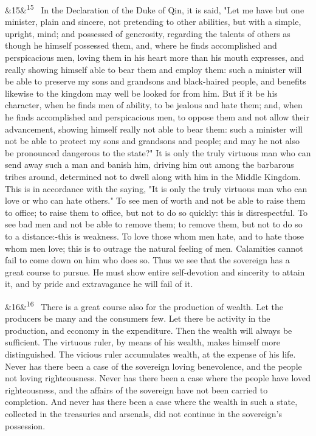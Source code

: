 \documentclass[12pt]{article}
\newcommand{\para}[1][]{\par\noindent\ifx&#1&\else\textsuperscript{\footnotesize #1}~\fi}
\begin{document}
\para[15] In the Declaration of the Duke of Qin, it is said, "Let me have but one minister, plain and sincere, not pretending to other abilities, but with a simple, upright, mind; and possessed of generosity, regarding the talents of others as though he himself possessed them, and, where he finds accomplished and perspicacious men, loving them in his heart more than his mouth expresses, and really showing himself able to bear them and employ them: such a minister will be able to preserve my sons and grandsons and black-haired people, and benefits likewise to the kingdom may well be looked for from him. But if it be his character, when he finds men of ability, to be jealous and hate them; and, when he finds accomplished and perspicacious men, to oppose them and not allow their advancement, showing himself really not able to bear them: such a minister will not be able to protect my sons and grandsons and people; and may he not also be pronounced dangerous to the state?" It is only the truly virtuous man who can send away such a man and banish him, driving him out among the barbarous tribes around, determined not to dwell along with him in the Middle Kingdom. This is in accordance with the saying, "It is only the truly virtuous man who can love or who can hate others." To see men of worth and not be able to raise them to office; to raise them to office, but not to do so quickly: this is disrespectful. To see bad men and not be able to remove them; to remove them, but not to do so to a distance:-this is weakness. To love those whom men hate, and to hate those whom men love; this is to outrage the natural feeling of men. Calamities cannot fail to come down on him who does so. Thus we see that the sovereign has a great course to pursue. He must show entire self-devotion and sincerity to attain it, and by pride and extravagance he will fail of it.

\para[16] There is a great course also for the production of wealth. Let the producers be many and the consumers few. Let there be activity in the production, and economy in the expenditure. Then the wealth will always be sufficient. The virtuous ruler, by means of his wealth, makes himself more distinguished. The vicious ruler accumulates wealth, at the expense of his life. Never has there been a case of the sovereign loving benevolence, and the people not loving righteousness. Never has there been a case where the people have loved righteousness, and the affairs of the sovereign have not been carried to completion. And never has there been a case where the wealth in such a state, collected in the treasuries and arsenals, did not continue in the sovereign's possession.
\end{document}
